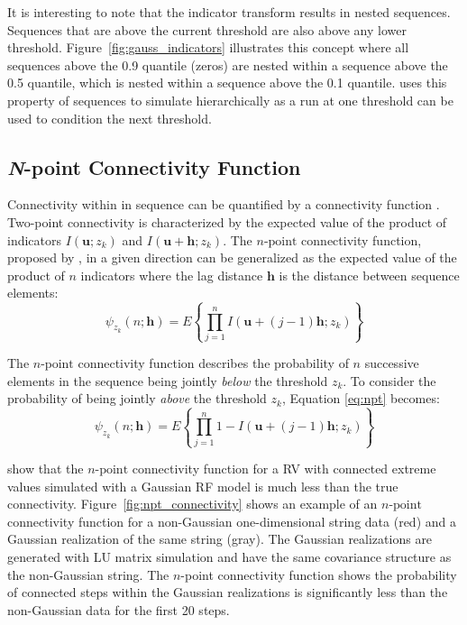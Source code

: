 It is interesting to note that the indicator transform results in nested sequences. Sequences that are above the current threshold are also above any lower threshold. Figure~\ref{fig:gauss_indicators} illustrates this concept where all sequences above the 0.9 quantile (zeros) are nested within a sequence above the 0.5 quantile, which is nested within a sequence above the 0.1 quantile. \cite{ortiz2003characterization} uses this property of sequences to simulate hierarchically as a run at one threshold can be used to condition the next threshold.

\FloatBarrier
\subsection{\textit{N}-point Connectivity Function}
\label{subsec:03npoint}

Connectivity within in sequence can be quantified by a connectivity function \citep{renard2011conditioning}. Two-point connectivity is characterized by the expected value of the product of indicators $I(\mathbf{u}; z_{k})$ and $I(\mathbf{u}+\mathbf{h}; z_{k})$. The $n\text{-point}$ connectivity function, proposed by \cite{journel1989nongaussian}, in a given direction can be generalized as the expected value of the product of $n$ indicators where the lag distance $\mathbf{h}$ is the distance between sequence elements:
\begin{equation}
    \psi_{z_{k}}(n;\mathbf{h}) = E\left\{\prod_{j=1}^{n} I(\mathbf{u} + (j-1)\mathbf{h}; z_{k})\right\}
    \label{eq:npt}
\end{equation}

The $n\text{-point}$ connectivity function describes the probability of $n$ successive elements in the sequence being jointly \emph{below} the threshold $z_{k}$. To consider the probability of being jointly \emph{above} the threshold $z_{k}$, Equation \ref{eq:npt} becomes:
\begin{equation}
    \psi_{z_{k}}(n;\mathbf{h}) = E\left\{\prod_{j=1}^{n} 1 - I(\mathbf{u} + (j-1)\mathbf{h}; z_{k})\right\}
    \label{eq:npt2}
\end{equation}

\cite{journel1989nongaussian} show that the $n\text{-point}$ connectivity function for a \gls{RV} with connected extreme values simulated with a Gaussian \gls{RF} model is much less than the true connectivity. Figure~\ref{fig:npt_connectivity} shows an example of an $n\text{-point}$ connectivity function for a non-Gaussian one-dimensional string data (red) and a Gaussian realization of the same string (gray). The Gaussian realizations are generated with LU matrix simulation \citep{davis1987production} and have the same covariance structure as the non-Gaussian string. The $n$-point connectivity function shows the probability of connected steps within the Gaussian realizations is significantly less than the non-Gaussian data for the first 20 steps.


